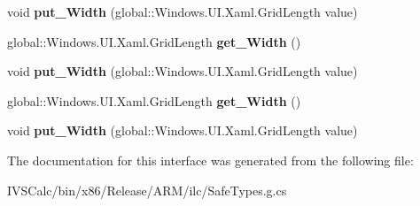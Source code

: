 \begin{DoxyCompactItemize}
\item 
\mbox{\label{interface_windows_1_1_u_i_1_1_xaml_1_1_controls_1_1_i_column_definition_ac5a45d834033be5522cf49d9121cd964}} 
void {\bfseries put\+\_\+\+Width} (global\+::\+Windows.\+U\+I.\+Xaml.\+Grid\+Length value)
\item 
\mbox{\label{interface_windows_1_1_u_i_1_1_xaml_1_1_controls_1_1_i_column_definition_aeda3fef18a060b8631bd988c7ea2c77e}} 
global\+::\+Windows.\+U\+I.\+Xaml.\+Grid\+Length {\bfseries get\+\_\+\+Width} ()
\item 
\mbox{\label{interface_windows_1_1_u_i_1_1_xaml_1_1_controls_1_1_i_column_definition_ac5a45d834033be5522cf49d9121cd964}} 
void {\bfseries put\+\_\+\+Width} (global\+::\+Windows.\+U\+I.\+Xaml.\+Grid\+Length value)
\item 
\mbox{\label{interface_windows_1_1_u_i_1_1_xaml_1_1_controls_1_1_i_column_definition_aeda3fef18a060b8631bd988c7ea2c77e}} 
global\+::\+Windows.\+U\+I.\+Xaml.\+Grid\+Length {\bfseries get\+\_\+\+Width} ()
\item 
\mbox{\label{interface_windows_1_1_u_i_1_1_xaml_1_1_controls_1_1_i_column_definition_ac5a45d834033be5522cf49d9121cd964}} 
void {\bfseries put\+\_\+\+Width} (global\+::\+Windows.\+U\+I.\+Xaml.\+Grid\+Length value)
\end{DoxyCompactItemize}


The documentation for this interface was generated from the following file\+:\begin{DoxyCompactItemize}
\item 
I\+V\+S\+Calc/bin/x86/\+Release/\+A\+R\+M/ilc/Safe\+Types.\+g.\+cs\end{DoxyCompactItemize}
